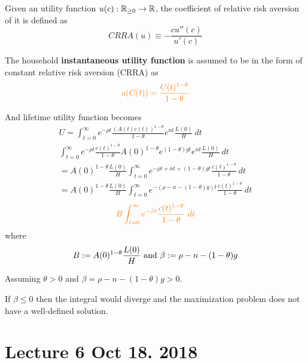 \documentclass[11pt]{article}
\begin{document}
	\begin{definition}
		Given an utility function $u(c): \mathbb{R}_{\geq 0} \to \mathbb{R}$, the coefficient of relative risk aversion of it is defined as
		\begin{equation}
			CRRA(u) \equiv - \frac{c u''(c)}{u'(c)}
		\end{equation}
	\end{definition}
	
	\begin{assumption}
		The household \textbf{instantaneous utility function} is assumed to be in the form of constant relative risk aversion (CRRA) as 
		\begin{equation}
		\textcolor{orange}{
			u(C(t)) = \frac{C(t)^{1 - \theta}}{1 - \theta}
			}
		\end{equation}
	\end{assumption}
	And lifetime utility function becomes
	\begin{gather}
		U = \int_{t=0}^\infty e^{-\rho t} \frac{(A(t)c(t))^{1-\theta}}{1-\theta} e^{nt} \frac{L(0)}{H}\ dt\\
		\int_{t=0}^\infty e^{-\rho t} \frac{c(t)^{1-\theta}}{1-\theta} A(0)^{1-\theta} e^{(1-\theta)gt} e^{nt} \frac{L(0)}{H}\ dt\\
		= A(0)^{1 - \theta} \frac{L(0)}{H} \int_{t=0}^\infty {e^{-\rho t + nt + (1-\theta)gt} \frac{c(t)^{1-\theta}}{1-\theta}\ dt} \\
		= A(0)^{1 - \theta} \frac{L(0)}{H} \int_{t=0}^\infty {e^{-(\rho - n - (1-\theta)g)t} \frac{c(t)^{1-\theta}}{1-\theta}\ dt}
	\end{gather}
	\begin{equation}
	\textcolor{orange}{
		B \int_{t=0}^\infty e^{-\beta t}\frac{c(t)^{1-\theta}}{1- \theta}\ dt
	}
	\end{equation}
	where
	\begin{equation}
		B := A(0)^{1-\theta} \frac{L(0)}{H}\text{{ and }} \beta := \rho - n - (1-\theta)g
	\end{equation}
	\begin{assumption}
		Assuming $\theta > 0$ and $\beta = \rho - n - (1-\theta)g > 0$.
	\end{assumption}
	
	\begin{remark}
		If $\beta \leq 0$ then the integral would diverge and the maximization problem does not have a well-defined solution.
	\end{remark}
	
	\section{Lecture 6 Oct 18. 2018}
\end{document}
